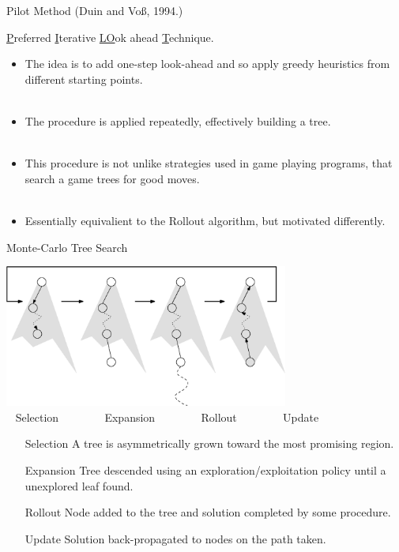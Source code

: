 \documentclass[compress]{beamer}
\begin{document}
\begin{frame}{Pilot Method (Duin and Vo\ss, 1994.)}

\underline{P}referred \underline{I}terative \underline{LO}ok ahead \underline{T}echnique.

\begin{itemize}
\item The idea is to add one-step look-ahead and so apply greedy heuristics from different starting points. \\  \ \\
\pause
\item The procedure is applied repeatedly, effectively building a tree. \\ \ \\ \pause
\item This procedure is not unlike strategies used in game playing programs, that search a game trees for good 
moves.\\ \ \\ \pause
\item Essentially equivalient to the Rollout algorithm, but motivated differently.
\end{itemize}

\end{frame}

\begin{frame}{Monte-Carlo Tree Search}
\begin{center}
\includegraphics[width=0.7\textwidth]{figs/mcts.eps}\\
~ Selection ~~~~~~~ Expansion ~~~~~~~ Rollout ~~~~~~~ Update
\end{center}
{\small
\begin{itemize}
\item[Selection] A tree is asymmetrically grown toward the most promising region.\pause
\item[Expansion] Tree descended using an exploration/exploitation policy until a unexplored leaf found.\pause
\item[Rollout] Node added to the tree and solution completed by some procedure.\pause
\item[Update] Solution back-propagated to nodes on the path taken.
\end{itemize}}
\end{frame}
\end{document}
